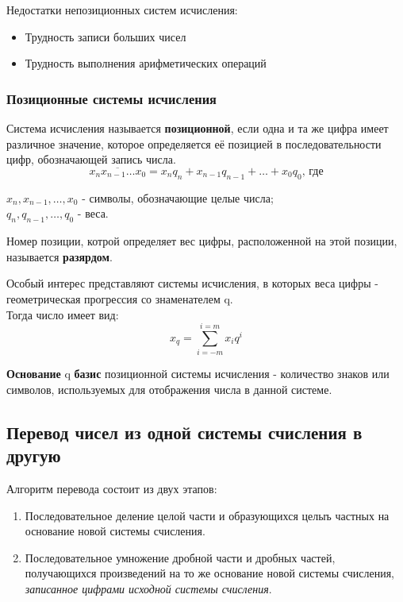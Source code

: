 Недостатки непозиционных систем исчисления:
\begin{itemize}
  \item Трудность записи больших чисел
  \item Трудность выполнения арифметических операций
\end{itemize}

\subsubsection{Позиционные системы исчисления}

\begin{definition}
  Система исчисления называется \textbf{позиционной}, если одна и та же цифра имеет различное значение, которое определяется её позицией в последовательности цифр, обозначающей запись числа.
  \[
    \overline{x_{n} x_{n-1} \ldots x_0} = x_{n} q_{n} + x_{n-1} q_{n-1} + \ldots + x_0 q_0 \text{, где}
  \]
  \begin{center}
    $x_{n}, x_{n-1}, \ldots, x_{0}$ - символы, обозначающие целые числа; \\
    $q_{n}, q_{n-1}, \ldots, q_0$ - веса.
  \end{center}
\end{definition}

\begin{definition}
  Номер позиции, котрой определяет вес цифры, расположенной на этой позиции, называется \textbf{разярдом}.
\end{definition}

Особый интерес представляют системы исчисления, в которых веса цифры - геометрическая прогрессия со знаменателем q. \\
Тогда число имеет вид:
\[
  x_q = \sum_{i=-m}^{i=m} x_i q^i
\] 

\begin{definition}
  \textbf{Основание} q \textbf{базис} позиционной системы исчисления - количество знаков или символов, используемых для отображения числа в данной системе.
\end{definition}


\subsection{Перевод чисел из одной системы счисления в другую}

Алгоритм перевода состоит из двух этапов:
\begin{enumerate}
  \item Последовательное деление целой части и образующихся целыъ частных на основание новой системы счисления.
  \item Последовательное умножение дробной части и дробных частей, получающихся произведений на то же основание новой системы счисления, \textit{записанное цифрами исходной системы счисления}. 
\end{enumerate}


